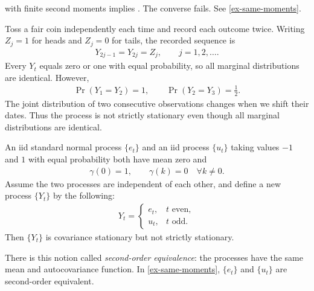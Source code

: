 \documentclass[a4paper,12pt]{article}
\begin{document}
\begin{remark}
	 with finite second moments implies .
	The converse fails.
	See \autoref{ex-same-moments}.
\end{remark}

\begin{example}
	Toss a fair coin independently each time and record each outcome twice.
	Writing $Z_j=1$ for heads and $Z_j=0$ for tails, the recorded sequence is
	\begin{align}
		Y_{2j-1}=Y_{2j}=Z_j,\qquad j=1,2,\ldots.
	\end{align}
	Every $Y_t$ equals zero or one with equal probability, so all marginal distributions are identical.
	However,
	\begin{align}
		\Pr(Y_1=Y_2)=1,\qquad \Pr(Y_2=Y_3)=\frac12.
	\end{align}
	The joint distribution of two consecutive observations changes when we shift their dates.
	Thus the process is not strictly stationary even though all marginal distributions are identical.
\end{example}

\begin{example}\label{ex-same-moments}
	An \gls{iid} standard normal process $\{e_t\}$ and an \gls{iid} process $\{u_t\}$ taking values $-1$ and $1$
	with equal probability both have mean zero and
	\begin{align}
		\gamma(0)=1,\qquad \gamma(k)=0\quad\forall k\neq0.
	\end{align}
	Assume the two processes are independent of each other,
	and define a new process $\{Y_t\}$ by the following:
	\begin{align}\label{eq-even-odd-process}
		Y_t=
		\begin{cases}
			e_t, & t\text{ even},\\
			u_t, & t\text{ odd}.
		\end{cases}
	\end{align}
	Then $\{Y_t\}$ is covariance stationary but not strictly stationary.
\end{example}

\begin{remark}
	There is this notion called \emph{second-order equivalence}:
	the processes have the same mean and autocovariance function.
	In \autoref{ex-same-moments}, $\{e_t\}$ and $\{u_t\}$ are second-order equivalent.
\end{remark}
\end{document}

